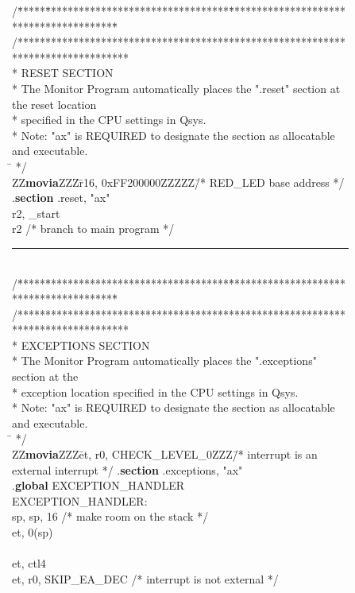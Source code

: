 \begin{figure}[h!]
\begin{center}
\begin{minipage}[t]{12.5 cm}
\begin{tabbing}
/\=*****\=*********************************\=****************************************\=\kill
/********************************************************************************\\
\>* RESET SECTION\\
\>* The Monitor Program automatically places the ".reset" section at the reset location\\
\>* specified in the CPU settings in Qsys.\\
\>* Note: "ax" is REQUIRED to designate the section as allocatable and executable.\\
\=\kill
\>*/\\
ZZ\={\bf movia}ZZZ\=r16, 0xFF200000ZZZZZ\=/* RED\_LED base address */\kill
\>.{\bf section} \>.reset, "ax"\\
 \>r2, \_start\\
 \>r2 \>/* branch to main program */\\
\rule{6.0in}{0in}~\\
/\=*****\=*********************************\=****************************************\=\kill
/********************************************************************************\\
\>* EXCEPTIONS SECTION\\
\>* The Monitor Program automatically places the ".exceptions" section at the\\
\>* exception location specified in the CPU settings in Qsys.\\
\>* Note: "ax" is REQUIRED to designate the section as allocatable and executable.\\
\=\kill
\>*/\\
ZZ\={\bf movia}ZZZ\=et, r0, CHECK\_LEVEL\_0ZZZ\=/* interrupt is an external interrupt */\kill
\>.{\bf section} \>.exceptions, "ax"\\
\>.{\bf global} \>EXCEPTION\_HANDLER\\
EXCEPTION\_HANDLER:\\
 \>sp, sp, 16 \>/* make room on the stack */\\
 \>et, 0(sp)\\
~\\
 \>et, ctl4\\
 \>et, r0, SKIP\_EA\_DEC \>/* interrupt is not external */\\

\end{tabbing}
\end{minipage}
\end{center}
\end{figure}

